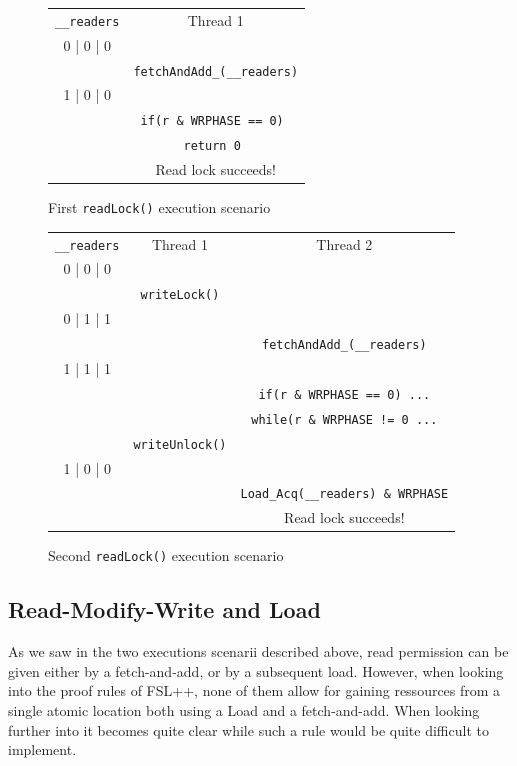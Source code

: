\begin{figure}
\begin{tabular}{c||c}
	\texttt{\_\_readers} & Thread 1\\
	0 | 0 | 0 & \\
	 &   \texttt{fetchAndAdd\_(\_\_readers)} \\
	1 | 0 | 0 & \\
	 & \texttt{if(r \& WRPHASE == 0) } \\
	& \texttt{return 0 } \\
	&  Read lock succeeds!
\end{tabular}
		\label{fig:scen1}
		\caption{First \texttt{readLock()} execution scenario}
\end{figure}
\begin{figure}
\begin{tabular}{c||c|c}
	\texttt{\_\_readers} & Thread 1 & Thread 2 \\
	0 | 0 | 0 & & \\
	 & \texttt{writeLock()} & \\
	0 | 1 | 1 &   & \\
	 &   & \texttt{fetchAndAdd\_(\_\_readers)} \\
	1 | 1 | 1 & & \\
		& & \texttt{if(r \& WRPHASE == 0) ...} \\
		& & \texttt{while(r \& WRPHASE != 0 ...} \\
	 & \texttt{writeUnlock()} & \\
		1 | 0 | 0 & & \\
		& & \texttt{Load\_Acq(\_\_readers) \& WRPHASE} \\
		& & Read lock succeeds!
\end{tabular}
		\label{fig:scen2}
		\caption{Second \texttt{readLock()} execution scenario}
\end{figure}


		\subsection{Read-Modify-Write and Load}
	\label{subsec:glibcRWPb}
As we saw in the two executions scenarii described above, read permission can be given either by a fetch-and-add, or by a subsequent load. However, when looking into the proof rules of FSL++, none of them allow for gaining ressources from a single atomic location both using a Load and a fetch-and-add. When looking further into it becomes quite clear while such a rule would be quite difficult to implement.

